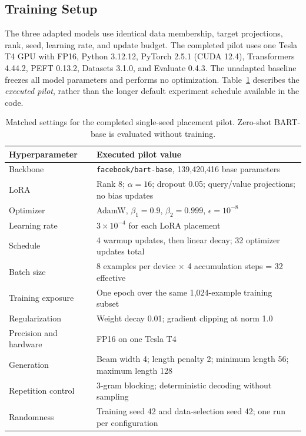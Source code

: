 \documentclass[11pt, letterpaper]{article}
\begin{document}
\subsection{Training Setup}
The three adapted models use identical data membership, target projections,
rank, seed, learning rate, and update budget. The completed pilot uses one
Tesla T4 GPU with FP16, Python 3.12.12, PyTorch 2.5.1 (CUDA 12.4),
Transformers 4.44.2, PEFT 0.13.2, Datasets 3.1.0, and Evaluate 0.4.3.
The unadapted baseline freezes all model parameters and performs no optimization.
Table~\ref{tab:hyperparams} describes the \emph{executed pilot}, rather than the
longer default experiment schedule available in the code.

\begin{table}[ht]
\centering\small
\begin{tabular}{p{4.0cm}p{11.1cm}}
\toprule
Hyperparameter & Executed pilot value \\
\midrule
Backbone & \texttt{facebook/bart-base}, 139,420,416 base parameters \\
LoRA & Rank 8; $\alpha=16$; dropout 0.05; query/value projections; no bias updates \\
Optimizer & AdamW, $\beta_1=0.9$, $\beta_2=0.999$, $\epsilon=10^{-8}$ \\
Learning rate & $3\times10^{-4}$ for each LoRA placement \\
Schedule & 4 warmup updates, then linear decay; 32 optimizer updates total \\
Batch size & 8 examples per device $\times$ 4 accumulation steps = 32 effective \\
Training exposure & One epoch over the same 1,024-example training subset \\
Regularization & Weight decay 0.01; gradient clipping at norm 1.0 \\
Precision and hardware & FP16 on one Tesla T4 \\
Generation & Beam width 4; length penalty 2; minimum length 56; maximum length 128 \\
Repetition control & 3-gram blocking; deterministic decoding without sampling \\
Randomness & Training seed 42 and data-selection seed 42; one run per configuration \\
\bottomrule
\end{tabular}
\caption{Matched settings for the completed single-seed placement pilot. Zero-shot BART-base is evaluated without training.}
\label{tab:hyperparams}
\end{table}
\end{document}
